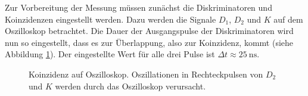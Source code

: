 Zur Vorbereitung der Messung müssen zunächst die Diskriminatoren und Koinzidenzen eingestellt werden. Dazu werden die Signale $D_1$, $D_2$ und $K$ auf dem Oszilloskop betrachtet. Die Dauer der Ausgangspulse der Diskriminatoren wird nun so eingestellt, dass es zur Überlappung, also zur Koinzidenz, kommt (siehe Abbildung \ref{fig:signal_oszi}). Der eingestellte Wert für alle drei Pulse ist $\Delta t \approx \SI{25}{\nano\second}$.

\begin{figure}[h]
  \centering
  \caption{Koinzidenz auf Oszilloskop. Oszillationen in Rechteckpulsen von $D_2$ und $K$ werden durch das Oszilloskop verursacht.}
  \label{fig:signal_oszi}
\end{figure}


